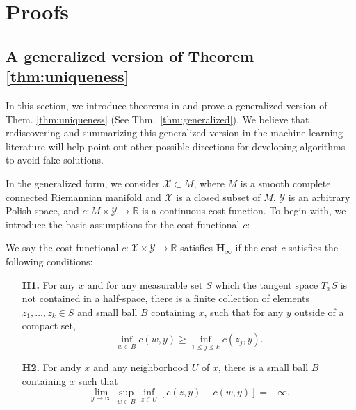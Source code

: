 \section{Proofs}

\subsection{A generalized version of Theorem \ref{thm:uniqueness}}

In this section, we introduce theorems in \citet{villani} and prove a generalized version of Them. \ref{thm:uniqueness} (See Thm.~\ref{thm:generalized}). We believe that rediscovering and summarizing this generalized version in the machine learning literature will help point out other possible directions for developing algorithms to avoid fake solutions.

In the generalized form, we consider $\mathcal{X}\subset M$, where $M$ is a smooth complete connected Riemannian manifold and $\mathcal{X}$ is a closed subset of $M$. $\mathcal{Y}$ is an arbitrary Polish space, and $c:M\times \mathcal{Y}\rightarrow \mathbb{R}$ is a continuous cost function. 
To begin with, we introduce the basic assumptions for the cost functional $c$:
\begin{definition}
    We say the cost functional $c:\mathcal{X}\times \mathcal{Y}\rightarrow \mathbb{R}$ satisfies $\mathbf{H_\infty}$ if the cost $c$ satisfies the following conditions:
    \begin{enumerate}
        \item[\textbf{H1.}] For any $x$ and for any measurable set $S$ which the tangent space $T_x S$ is not contained in a half-space, there is a finite collection of elements $z_1, \dots, z_k \in S$ and small ball $B$ containing $x$, such that for any $y$ outside of a compact set,
        $$ \inf_{w\in B} c(w,y) \geq \inf_{1\leq j\leq k} c(z_j, y). $$
        \item[\textbf{H2.}] For andy $x$ and any neighborhood $U$ of $x$, there is a small ball $B$ containing $x$ such that 
        $$ \lim_{y\rightarrow \infty} \sup_{w\in B} \inf_{z\in U} [c(z,y) - c(w,y)] = - \infty. $$
    \end{enumerate}
\end{definition}

